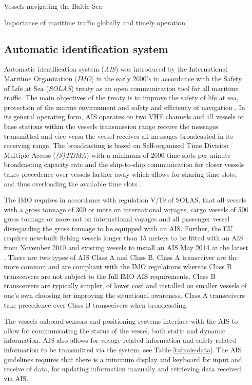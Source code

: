 \documentclass[../main.tex]{subfiles}
\begin{document}
Vessels navigating the Baltic Sea

Importance of maritime traffic globally and timely operation


\subsection{Automatic identification system}

Automatic identification system (\textit{AIS}) was introduced by the International Maritime Organization (\textit{IMO}) in the early 2000's in accordance with the Safety of Life at Sea (\textit{SOLAS}) treaty as an open communication tool for all maritime traffic. The main objectives of the treaty is to improve the safety of life at sea, protection of the marine environment and safety and efficiency of navigation \cite{IMO_2015}. In its general operating form, AIS operates on two VHF channels and all vessels or base stations within the vessels transmission range receive the messages transmitted and vice versa the vessel receives all messages broadcasted in its receiving range. The broadcasting is based on Self-organized Time Division Multiple Access (\textit{(S)TDMA}) with a minimum of 2000 time slots per minute broadcasting capacity rate and the ship-to-ship communication for closer vessels takes precedence over vessels farther away which allows for sharing time slots, and thus overloading the available time slots \cite{IMO_2015}.

The IMO requires in accordance with regulation V/19 of SOLAS, that all vessels with a gross tonnage of 300 or more on international voyages, cargo vessels of 500 gross tonnage or more not on international voyages and all passenger vessel disregarding the gross tonnage to be equipped with an AIS. Further, the EU requires new-built fishing vessels longer than 15 meters to be fitted with an AIS from November 2010 and existing vessels to install an AIS May 2014 at the latest \cite{EU_2011}. There are two types of AIS Class A and Class B. Class A transceiver are the more common and are compliant with the IMO regulations whereas Class B transceivers are not subject to the full IMO AIS requirements. Class B transceivers are typically simpler, of lower cost and installed on smaller vessels of one's own choosing for improving the situational awareness. Class A transceivers take precedence over Class B transceivers when broadcasting.

The vessels onboard sensors and positioning systems interface with the AIS to allow for communicating the status of the vessel, both static and dynamic information. AIS also allows for voyage related information and safety-related information to be transmitted via the system, see Table \ref{tab:ais-data}. The AIS guidelines requires that there is a minimum display and keyboard for input and receive of data, for updating information manually and retrieving data received via AIS.
\end{document}
